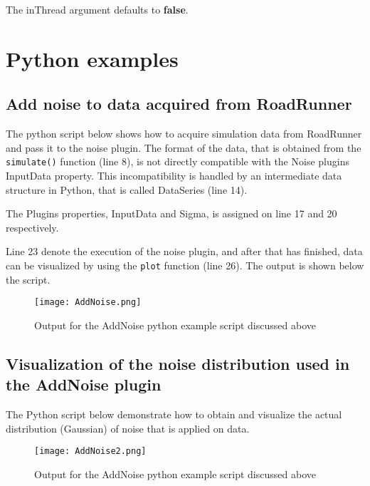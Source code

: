 The inThread argument defaults to \textbf{false}.

\section{Python examples}

\subsection{Add noise to data acquired from RoadRunner}
The python script below shows how to acquire simulation data from RoadRunner and pass it to the noise plugin. The format of the data, that is obtained from the \verb|simulate()| function (line 8), is not directly compatible with the Noise plugins InputData property. This incompatibility is handled by an intermediate data structure in Python, that is called DataSeries (line 14).

The Plugins properties, InputData and Sigma, is assigned on line 17 and 20 respectively.

Line 23 denote the execution of the noise plugin, and after that has finished, data can be visualized by using the \verb|plot| function (line 26). The output is shown below the script.

\begin{singlespace}

\end{singlespace}

\begin{figure}[ht]
\centering
\texttt{[image: AddNoise.png]}
\caption{Output for the AddNoise python example script discussed above}
\label{fig:addNoiseFig1}
\end{figure}

\subsection{Visualization of the noise distribution used in the AddNoise plugin}
The Python script below demonstrate how to obtain and visualize the actual distribution (Gaussian) of noise that is applied on data.

\begin{singlespace}

\end{singlespace}

\begin{figure}[ht]
\centering
\texttt{[image: AddNoise2.png]}
\caption{Output for the AddNoise python example script discussed above}
\label{fig:addNoiseFig2}
\end{figure}
